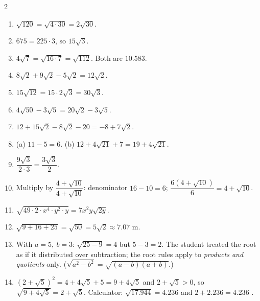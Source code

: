 \documentclass[11pt]{article}
\begin{document}
\begin{keybox}
\begin{multicols}{2}
\small
\begin{enumerate}[leftmargin=*,itemsep=3pt]
  \item $\sqrt{120}=\sqrt{4\cdot30}=2\sqrt{30}$.
  \item $675=225\cdot3$, so $15\sqrt3$.
  \item $4\sqrt7=\sqrt{16\cdot7}=\sqrt{112}$. Both are $10.583$.
  \item $8\sqrt2+9\sqrt2-5\sqrt2=12\sqrt2$.
  \item $15\sqrt{12}=15\cdot2\sqrt3=30\sqrt3$.
  \item $4\sqrt{50}-3\sqrt5=20\sqrt2-3\sqrt5$.
  \item $12+15\sqrt2-8\sqrt2-20=-8+7\sqrt2$.
  \item (a) $11-5=6$. \quad (b) $12+4\sqrt{21}+7=19+4\sqrt{21}$.
  \item $\dfrac{9\sqrt3}{2\cdot3}=\dfrac{3\sqrt3}{2}$.
  \item Multiply by $\dfrac{4+\sqrt{10}}{4+\sqrt{10}}$: denominator $16-10=6$; $\dfrac{6(4+\sqrt{10})}{6}=4+\sqrt{10}$.
  \item $\sqrt{49\cdot2\cdot x^4\cdot y^2\cdot y}=7x^2y\sqrt{2y}$.
  \item $\sqrt{9+16+25}=\sqrt{50}=5\sqrt2\approx7.07$ m.
  \item With $a=5,\ b=3$: $\sqrt{25-9}=4$ but $5-3=2$. The student treated the root as if it distributed over subtraction; the root rules apply to \emph{products and quotients} only. ($\sqrt{a^2-b^2}=\sqrt{(a-b)(a+b)}$.)
  \item $(2+\sqrt5)^2=4+4\sqrt5+5=9+4\sqrt5$ and $2+\sqrt5>0$, so $\sqrt{9+4\sqrt5}=2+\sqrt5$. Calculator: $\sqrt{17.944}=4.236$ and $2+2.236=4.236$ \checkmark.
\end{enumerate}
\end{multicols}
\end{keybox}
\end{document}
